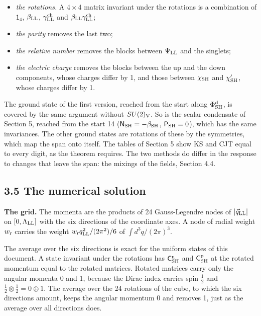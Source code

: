 \documentclass[
  10pt,
]{article}
\providecommand{\tightlist}{%
  \setlength{\itemsep}{0pt}\setlength{\parskip}{0pt}}
\begin{document}
\begin{itemize}
\tightlist
\item
  \emph{the rotations.} A \(4\times4\) matrix invariant under the
  rotations is a combination of \(\mathsf 1_4\), \(\beta_{\rm LL}\),
  \(\gamma^{\rm ch}_{\rm LL}\) and
  \(\beta_{\rm LL}\gamma^{\rm ch}_{\rm LL}\);
\item
  \emph{the parity} removes the last two;
\item
  \emph{the relative number} removes the blocks between
  \(\Psi_{\rm LL}\) and the singlets;
\item
  \emph{the electric charge} removes the blocks between the up and the
  down components, whose charges differ by 1, and those between
  \(\chi_{\rm SH}\) and \(\chi'_{\rm SH}\), whose charges differ by 1.
\end{itemize}

The ground state of the first version, reached from the start along
\(\Phi^{\rm d}_{\rm SH}\), is covered by the same argument without
\(SU(2)_{\rm V}\). So is the scalar condensate of Section 5, reached
from the start 14 (\(\mathsf N_{\rm SH}=-\beta_{\rm SH}\),
\(\mathsf P_{\rm SH}=0\)), which has the same invariances. The other
ground states are rotations of these by the symmetries, which map the
span onto itself. The tables of Section 5 show KS and CJT equal to every
digit, as the theorem requires. The two methods do differ in the
response to changes that leave the span: the mixings of the fields,
Section 4.4.

\hypertarget{the-numerical-solution}{%
\subsection{3.5 The numerical solution}\label{the-numerical-solution}}

\textbf{The grid.} The momenta are the products of 24 Gauss-Legendre
nodes of \(\lvert\vec q_{\rm LL}\rvert\) on \([0,\Lambda_{\rm LL}]\)
with the six directions of the coordinate axes. A node of radial weight
\(w_{\rm r}\) carries the weight \(w_{\rm r}q_{\rm LL}^2/(2\pi^2)/6\) of
\(\int d^3q/(2\pi)^3\).

The average over the six directions is exact for the uniform states of
this document. A state invariant under the rotations has
\(\mathsf C^{\rm n}_{\rm SH}\) and \(\mathsf C^{\rm p}_{\rm SH}\) at the
rotated momentum equal to the rotated matrices. Rotated matrices carry
only the angular momenta 0 and 1, because the Dirac index carries spin
\(\tfrac12\) and \(\tfrac12\otimes\tfrac12=0\oplus1\). The average over
the 24 rotations of the cube, to which the six directions amount, keeps
the angular momentum 0 and removes 1, just as the average over all
directions does.
\end{document}
